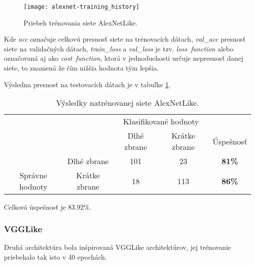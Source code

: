 \begin{figure}[H]
	\centering
	\texttt{[image: alexnet-training\_history]}
	\caption{Priebeh trénovania siete AlexNetLike.}
	\label{pic:alexnetlikehistory}
\end{figure}
Kde \textit{acc} označuje celkovú presnosť siete na trénovacích dátach, \textit{val\_acc} presnosť siete na validačných dátach, \textit{train\_loss} a
    \textit{val\_loss} je tzv. \textit{loss\ function} alebo označovaná aj ako \textit{cost\ function}, ktorá v jednoduchosti určuje nepresnosť danej siete,
    to znamená že čím nižšia hodnota tým lepšia.

Výsledna presnosť na testovacích dátach je v tabuľke \ref{tab:alexnetresults}.

\begin{table}[H]
    \centering
    \begin{tabular}{ccccc}
                                                                &                                    & \multicolumn{2}{c}{Klasifikované hodnoty}                                                         &                                    \\ \cline{3-5} 
                                                                & \multicolumn{1}{c|}{}              & \multicolumn{1}{c|}{Dlhé zbrane}                & \multicolumn{1}{c|}{Krátke zbrane}              & \multicolumn{1}{c|}{Úspešnosť}     \\ \cline{2-5} 
        \multicolumn{1}{c|}{}                                  & \multicolumn{1}{c|}{Dlhé zbrane}   & \multicolumn{1}{c|}{{\color[HTML]{009901} 101}} & \multicolumn{1}{c|}{{\color[HTML]{9A0000} 23}}  & \multicolumn{1}{c|}{\textbf{81\%}} \\ \cline{2-5} 
        \multicolumn{1}{c|}{\multirow{-2}{*}{Správne hodnoty}} & \multicolumn{1}{c|}{Krátke zbrane} & \multicolumn{1}{c|}{{\color[HTML]{9A0000} 18}}  & \multicolumn{1}{c|}{{\color[HTML]{009901} 113}} & \multicolumn{1}{c|}{\textbf{86\%}} \\ \cline{2-5} 
    \end{tabular}
    \caption{Výsledky natrénovanej siete AlexNetLike.}
    \label{tab:alexnetresults}
\end{table}
Celková úspešnosť je 83.92\%.

\subsubsection{VGGLike}
Druhá architektúra bola inšpirovaná VGGLike architektúrov, jej trénovanie priebehalo tak isto v 40 epochách.

